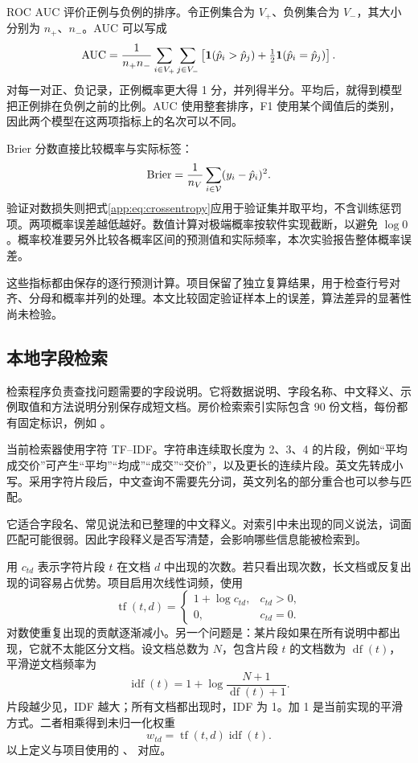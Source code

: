 ROC AUC 评价正例与负例的排序。令正例集合为 $V_+$、负例集合为 $V_-$，其大小分别为 $n_+$、$n_-$。AUC 可以写成
\begin{equation}\label{app:eq:auc}
\operatorname{AUC}=\frac{1}{n_+n_-}
\sum_{i\in V_+}\sum_{j\in V_-}
\left[\mathbf 1(\hat p_i>\hat p_j)+\tfrac12\mathbf 1(\hat p_i=\hat p_j)\right].
\end{equation}
对每一对正、负记录，正例概率更大得 1 分，并列得半分。平均后，就得到模型把正例排在负例之前的比例。AUC 使用整套排序，F1 使用某个阈值后的类别，因此两个模型在这两项指标上的名次可以不同。

Brier 分数直接比较概率与实际标签：
\begin{equation}
\operatorname{Brier}=\frac1{n_V}\sum_{i\in\mathcal{V}}(y_i-\hat p_i)^2.
\end{equation}
验证对数损失则把式\eqref{app:eq:crossentropy}应用于验证集并取平均，不含训练惩罚项。两项概率误差越低越好。数值计算对极端概率按软件实现截断，以避免 $\log0$。概率校准要另外比较各概率区间的预测值和实际频率，本次实验报告整体概率误差。

这些指标都由保存的逐行预测计算。项目保留了独立复算结果，用于检查行号对齐、分母和概率并列的处理。本文比较固定验证样本上的误差，算法差异的显著性尚未检验。


\subsection{本地字段检索}
检索程序负责查找问题需要的字段说明。它将数据说明、字段名称、中文释义、示例取值和方法说明分别保存成短文档。房价检索索引实际包含 90 份文档，每份都有固定标识，例如 。

当前检索器使用字符 TF--IDF。字符串连续取长度为 2、3、4 的片段，例如“平均成交价”可产生“平均”“均成”“成交”“交价”，以及更长的连续片段。英文先转成小写。采用字符片段后，中文查询不需要先分词，英文列名的部分重合也可以参与匹配。

它适合字段名、常见说法和已整理的中文释义。对索引中未出现的同义说法，词面匹配可能很弱。因此字段释义是否写清楚，会影响哪些信息能被检索到。

用 $c_{td}$ 表示字符片段 $t$ 在文档 $d$ 中出现的次数。若只看出现次数，长文档或反复出现的词容易占优势。项目启用次线性词频，使用
\begin{equation}
\operatorname{tf}(t,d)=
\begin{cases}
1+\log c_{td},&c_{td}>0,\\
0,&c_{td}=0.
\end{cases}
\end{equation}
对数使重复出现的贡献逐渐减小。另一个问题是：某片段如果在所有说明中都出现，它就不太能区分文档。设文档总数为 $N$，包含片段 $t$ 的文档数为 $\operatorname{df}(t)$，平滑逆文档频率为
\begin{equation}
\operatorname{idf}(t)=1+\log\frac{N+1}{\operatorname{df}(t)+1}.
\end{equation}
片段越少见，IDF 越大；所有文档都出现时，IDF 为 1。加 1 是当前实现的平滑方式。二者相乘得到未归一化权重
\[
w_{td}=\operatorname{tf}(t,d)\operatorname{idf}(t).
\]
以上定义与项目使用的 、 对应\citep{sklearntfidf}。

